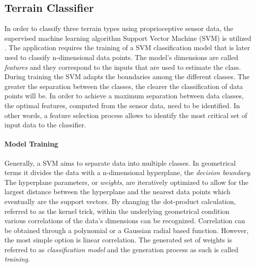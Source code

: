 \subsection{Terrain Classifier}

In order to classify three terrain types using proprioceptive sensor data, the supervised machine learning algorithm Support Vector Machine (SVM) is utilized \citep{cortes1995}. 
The application requires the training of a SVM classification model that is later used to classify n-dimensional data points.
The model's dimensions are called \emph{features} and they correspond to the inputs that are used to estimate the class. 
During training the SVM adapts the boundaries among the different classes. The greater the separation between the classes, the clearer the classification of data points will be.
In order to achieve a maximum separation between data classes, the optimal features, computed from the sensor data, need to be identified. 
In other words, a feature selection process allows to identify the most critical set of input data to the classifier. 

\paragraph*{Model Training}
Generally, a SVM aims to separate data into multiple classes. 
In geometrical terms it divides the data with a n-dimensional hyperplane, the \emph{decision boundary}. 
The hyperplane parameters, or \emph{weights}, are iteratively optimized to allow for the largest distance between the hyperplane and the nearest data points which eventually are the support vectors.  
By changing the dot-product calculation, referred to as the kernel trick, within the underlying geometrical condition various correlations of the data's dimensions can be recognized. 
Correlation can be obtained through a polynomial or a Gaussian radial based function. However, the most simple option is linear correlation.
The generated set of weights is referred to as \emph{classification model} and the generation process as such is called \emph{training}.%





